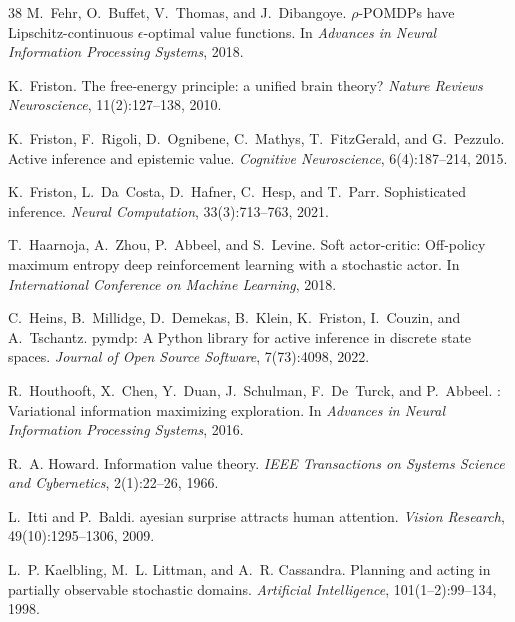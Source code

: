 \documentclass[runningheads]{llncs}
\begin{document}
\begin{thebibliography}{38}
M.~Fehr, O.~Buffet, V.~Thomas, and J.~Dibangoye.
\newblock $\rho$-{POMDP}s have {L}ipschitz-continuous $\epsilon$-optimal value functions.
\newblock In \emph{Advances in Neural Information Processing Systems}, 2018.

K.~Friston.
\newblock The free-energy principle: a unified brain theory?
\newblock \emph{Nature Reviews Neuroscience}, 11(2):127--138, 2010.

K.~Friston, F.~Rigoli, D.~Ognibene, C.~Mathys, T.~FitzGerald, and G.~Pezzulo.
\newblock Active inference and epistemic value.
\newblock \emph{Cognitive Neuroscience}, 6(4):187--214, 2015.

K.~Friston, L.~Da~Costa, D.~Hafner, C.~Hesp, and T.~Parr.
\newblock Sophisticated inference.
\newblock \emph{Neural Computation}, 33(3):713--763, 2021.

T.~Haarnoja, A.~Zhou, P.~Abbeel, and S.~Levine.
\newblock Soft actor-critic: Off-policy maximum entropy deep reinforcement learning with a stochastic actor.
\newblock In \emph{International Conference on Machine Learning}, 2018.

C.~Heins, B.~Millidge, D.~Demekas, B.~Klein, K.~Friston, I.~Couzin, and A.~Tschantz.
\newblock pymdp: A {P}ython library for active inference in discrete state spaces.
\newblock \emph{Journal of Open Source Software}, 7(73):4098, 2022.

R.~Houthooft, X.~Chen, Y.~Duan, J.~Schulman, F.~De~Turck, and P.~Abbeel.
: Variational information maximizing exploration.
\newblock In \emph{Advances in Neural Information Processing Systems}, 2016.

R.~A. Howard.
\newblock Information value theory.
\newblock \emph{IEEE Transactions on Systems Science and Cybernetics}, 2(1):22--26, 1966.

L.~Itti and P.~Baldi.
ayesian surprise attracts human attention.
\newblock \emph{Vision Research}, 49(10):1295--1306, 2009.

L.~P. Kaelbling, M.~L. Littman, and A.~R. Cassandra.
\newblock Planning and acting in partially observable stochastic domains.
\newblock \emph{Artificial Intelligence}, 101(1--2):99--134, 1998.


\end{thebibliography}
\end{document}
